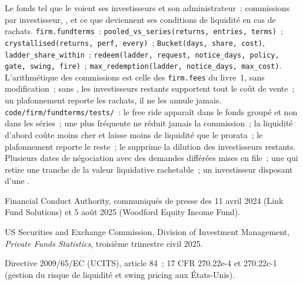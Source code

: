\begin{build}
 Le fonds tel que le voient ses investisseurs et son administrateur~: commissions par investisseur, , et ce que deviennent ses conditions de liquidité
en cas de rachats.
 \texttt{firm.fundterms}~: \texttt{pooled\_vs\_series(returns, entries, terms)}~; \texttt{crystallised(returns, perf, every)}~;
\texttt{Bucket(days, share, cost)}, \texttt{ladder\_share\_within}~; \texttt{redeem(ladder, request, notice\_days, policy, gate, swing, fire)}~;
\texttt{max\_redemption(ladder, notice\_days, max\_cost)}.
 L'arithmétique des commissions est celle des \texttt{firm.fees} du livre~1, sans modification~; sans , les investisseurs restants supportent tout le coût de vente~;
un plafonnement reporte les rachats, il ne les annule jamais.
 \texttt{code/firm/fundterms/tests/}~: le free ride apparaît dans le fonds groupé et non dans les séries~; une  plus fréquente
ne réduit jamais la commission~; la liquidité d'abord coûte moins cher et laisse moins de liquidité que le prorata~; le plafonnement reporte le reste~; le 
supprime la dilution des investisseurs restants.
 Plusieurs dates de négociation avec des demandes différées mises en file~; une  qui retire une tranche de la valeur liquidative rachetable~; un investisseur
disposant d'une .
\end{build}

\begin{omsources}
\item Financial Conduct Authority, communiqués de presse des 11 avril 2024 (Link Fund Solutions) et 5 août 2025 (Woodford Equity Income Fund).
\item US Securities and Exchange Commission, Division of Investment Management, \emph{Private Funds Statistics}, troisième trimestre civil 2025.
\item Directive 2009/65/EC (UCITS), article 84~; 17 CFR 270.22e-4 et 270.22c-1 (gestion du risque de liquidité et swing pricing aux États-Unis).
\end{omsources}

